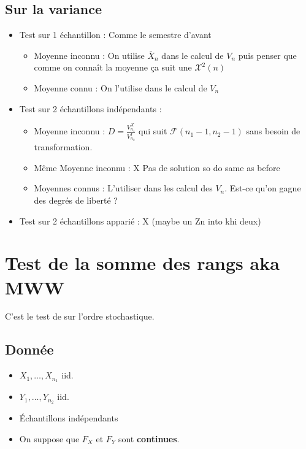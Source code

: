 \documentclass{article}
\theoremstyle{plain}%
\theoremstyle{definition}
\theoremstyle{remark}
\begin{document}
\subsection{Sur la variance}
\begin{itemize}
    \item Test sur 1 échantillon : Comme le semestre d'avant \begin{itemize}
        \item Moyenne inconnu : On utilise $ \bar{X}_n $ dans le calcul de $ V_n $ puis penser que comme on connaît la moyenne ça suit une $ \mathcal{X}^2(n) $ 
        \item Moyenne connu : On l'utilise dans le calcul de $ V_n $ 
    \end{itemize}
    
    \item Test sur 2 échantillons indépendants : \begin{itemize}
        \item Moyenne inconnu : $ D = \frac{V_{n_1}^X}{V_{n_2}^Y} $ qui suit $ \mathcal{F}(n_1 - 1, n_2 - 1) $ sans besoin de transformation.
        \item Même Moyenne inconnu : X Pas de solution so do same as before
        \item Moyennes connus : L'utiliser dans les calcul des $ V_n $. Est-ce qu'on gagne des degrés de liberté ?
    \end{itemize}

    \item Test sur 2 échantillons apparié : X (maybe un Zn into khi deux)
\end{itemize}

\section{Test de la somme des rangs aka MWW}
C'est le test de sur l'ordre stochastique.

\subsection*{Donnée}
\begin{itemize}
    \item $ X_1, \dots, X_{n_1}  $ iid. 
    \item $ Y_1, \dots, Y_{n_2}  $ iid.
    \item Échantillons indépendants
    \item On suppose que $ F_X $ et $ F_Y $ sont \textbf{continues}.
\end{itemize}
\end{document}
